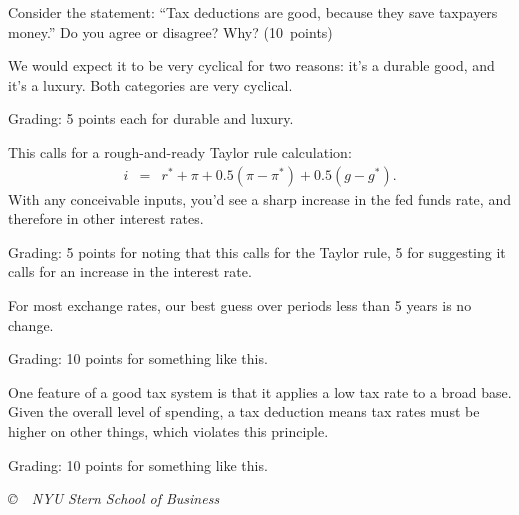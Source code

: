 \documentclass[letterpaper,12pt]{exam}
\begin{document}
\begin{questions}
\begin{parts}
\item Consider the statement:  ``Tax deductions are good, because they save taxpayers money.''
Do you agree or disagree?  Why?
(10~points)
\end{parts}

\begin{solution}
\begin{parts}
\item We would expect it to be very cyclical for two reasons:
it's a durable good, and it's a luxury.
Both categories are very cyclical.  

Grading:  5 points each for durable and luxury. 

\item This calls for a rough-and-ready Taylor rule calculation:
\begin{eqnarray*}
    i &=& r^* + \pi + 0.5 (\pi - \pi^*) + 0.5 (g - g^*) .
\end{eqnarray*}
With any conceivable inputs, you'd see a sharp increase in the fed funds rate, 
and therefore in other interest rates.  

Grading:  5 points for noting that this calls for the Taylor rule,
5 for suggesting it calls for an increase in the interest rate.  

\item For most exchange rates, our best guess over periods less than 5 years is no change.

Grading:  10 points for something like this. 

\item One feature of a good tax system is that it applies a low tax rate to a broad
base.  
Given the overall level of spending, a tax deduction means tax rates must be higher
on other things, which violates this principle. 

Grading:  10 points for something like this. 
\end{parts}
\end{solution}

\end{questions}


\vfill \centerline{\it \copyright \ \number\year \ NYU Stern
School of Business}
\end{document}
